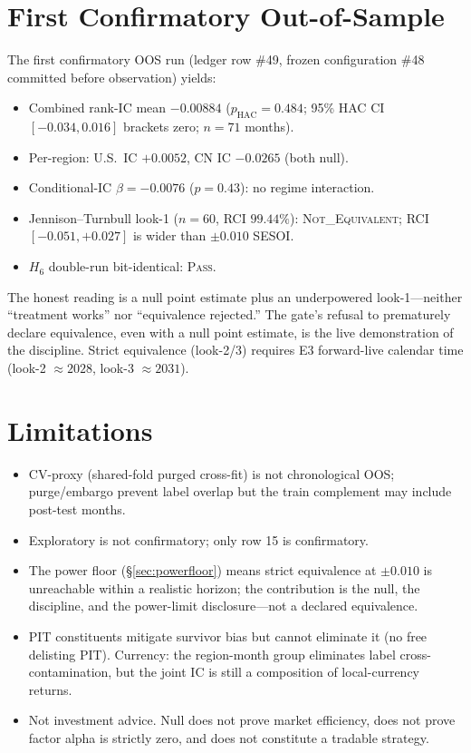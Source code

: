 \documentclass[11pt,a4paper]{article}
\begin{document}
\section{First Confirmatory Out-of-Sample}\label{sec:confirmatory}

The first confirmatory OOS run (ledger row \#49, frozen configuration \#48 committed
before observation) yields:
\begin{itemize}
\item Combined rank-IC mean $-0.00884$ ($p_\text{HAC}=0.484$; 95\% HAC CI $[-0.034, 0.016]$
brackets zero; $n=71$ months).
\item Per-region: U.S.\ IC $+0.0052$, CN IC $-0.0265$ (both null).
\item Conditional-IC $\beta = -0.0076$ ($p = 0.43$): no regime interaction.
\item Jennison--Turnbull look-1 ($n=60$, RCI $99.44\%$): \textsc{Not\_Equivalent};
RCI $[-0.051, +0.027]$ is wider than $\pm 0.010$ SESOI.
\item $H_6$ double-run bit-identical: \textsc{Pass}.
\end{itemize}

The honest reading is a null point estimate plus an underpowered look-1---neither
``treatment works'' nor ``equivalence rejected.'' The gate's refusal to prematurely
declare equivalence, even with a null point estimate, is the live demonstration of
the discipline. Strict equivalence (look-2/3) requires E3 forward-live calendar time
(look-2 $\approx 2028$, look-3 $\approx 2031$).

\section{Limitations}\label{sec:limitations}

\begin{itemize}
\item CV-proxy (shared-fold purged cross-fit) is not chronological OOS; purge/embargo
prevent label overlap but the train complement may include post-test months.
\item Exploratory is not confirmatory; only row 15 is confirmatory.
\item The power floor (\S\ref{sec:powerfloor}) means strict equivalence at $\pm 0.010$
is unreachable within a realistic horizon; the contribution is the null, the discipline,
and the power-limit disclosure---not a declared equivalence.
\item PIT constituents mitigate survivor bias but cannot eliminate it (no free
delisting PIT). Currency: the region-month group eliminates label cross-contamination,
but the joint IC is still a composition of local-currency returns.
\item Not investment advice. Null does not prove market efficiency, does not prove
factor alpha is strictly zero, and does not constitute a tradable strategy.
\end{itemize}
\end{document}
